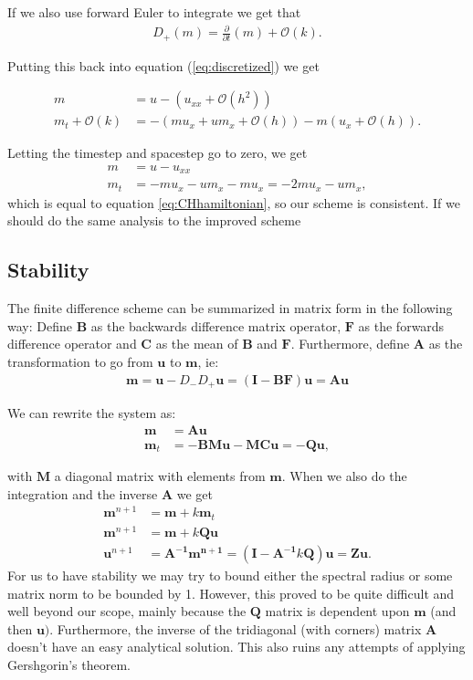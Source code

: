 If we also use forward Euler to integrate we get that
\begin{align*}
D_+ (m) =  \frac{\partial}{\partial t} (m) + \mathcal{O}(k).
\end{align*}

Putting this back into equation (\ref{eq:discretized}) we get

\begin{align*}
m &= u - \left( u_{xx} + \mathcal{O}\left(h^2\right) \right) \\
m_t  + \mathcal{O}(k) &= - \left( m u_x + u m_x + \mathcal{O}(h) \right) - m \left( u_x + \mathcal{O}(h) \right).
\end{align*}

Letting the timestep and spacestep go to zero, we get
\begin{align*}
m &= u - u_{xx} \\
m_t &= - m u_x - u m_x - m u_x = - 2m u_x - u m_x,
\end{align*}
which is equal to equation \ref{eq:CHhamiltonian}, so our scheme is consistent. If we should do the same analysis to the improved scheme 

\subsection*{Stability}
The finite difference scheme can be summarized in matrix form in the following way:
Define $\bm{B}$ as the backwards difference matrix operator, $\bm{F}$ as the forwards difference operator and $\bm{C}$ as the mean of $\bm{B}$ and $\bm{F}$. Furthermore, define $\bm{A}$ as the transformation to go from $\bm{u}$ to $\bm{m}$, ie:
\begin{align*}
\bm{m} = \bm{u}-D_-D_+\bm{u} = (\bm{I}-\bm{BF})\bm{u} = \bm{A} \bm{u}
\end{align*} 

We can rewrite the system as:
\begin{align*}
\bm{m} &= \bm{Au} \\
\bm{m}_t &= -\bm{BMu} - \bm{MCu} = \bm{-Qu},
\end{align*}

with $\bm{M}$ a diagonal matrix with elements from $\bm{m}$. When we also do the integration and the inverse $\bm{A}$ we get
\begin{align*}
\bm{m}^{n+1} &= \bm{m} + k\bm{m}_t \\
\bm{m}^{n+1} &= \bm{m} + k\bm{Qu} \\
\bm{u}^{n+1} &= \bm{A^{-1}m^{n+1}} = \left(\bm{I} -\bm{A^{-1}}k\bm{Q}\right)\bm{u} = \bm{Zu}.
\end{align*}
For us to have stability we may try to bound either the spectral radius or some matrix norm to be bounded by 1. However, this proved to be quite difficult and well beyond our scope, mainly because the $\bm{Q}$ matrix is dependent upon $\bm{m}$ (and then $\bm{u})$. Furthermore, the inverse of the tridiagonal (with corners) matrix $\bm{A}$ doesn't have an easy analytical solution. This also ruins any attempts of applying Gershgorin's theorem.


